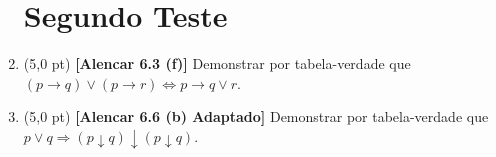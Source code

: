 \documentclass[12pt,a4paper,oneside]{article}
\begin{document}
\begin{enumerate}
	\section*{Segundo Teste}
	
	\item (5,0 pt) {\bf [Alencar 6.3 (f)]} Demonstrar por tabela-verdade que \\$(p \rightarrow q) \vee (p \rightarrow r) \Leftrightarrow p \rightarrow q \vee r$.
	
	\item (5,0 pt) {\bf [Alencar 6.6 (b) Adaptado]} Demonstrar por tabela-verdade que \\$p \vee q  \Rightarrow (p \downarrow q) \downarrow (p \downarrow q)$.
	

\end{enumerate}
\end{document}
